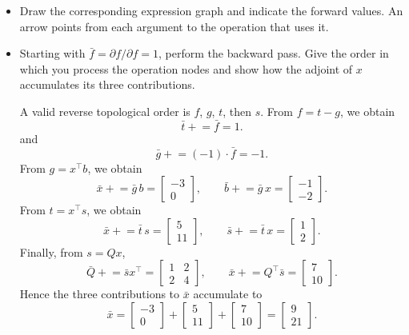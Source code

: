 \documentclass{article}
\theoremstyle{definition}
\theoremstyle{remark}
\begin{document}
\begin{itemize}
    \item Draw the corresponding expression graph and indicate the forward values. An arrow points from each argument to the operation that uses it.
    \item Starting with $\bar f=\partial f/\partial f=1$, perform the backward
    pass. Give the order in which you process the operation nodes and show how
    the adjoint of $x$ accumulates its three contributions.
    \begin{solution}
        A valid reverse topological order is $f$, $g$, $t$, then $s$. From
        $f=t-g$, we obtain
        \[
            \bar t \mathrel{+}=\bar f=1.
        \]
        and
        \[
            \bar g \mathrel{+}= (-1) \cdot \bar f=-1.
        \]
        From $g=x^\top b$, we obtain
        \[
            \bar x \mathrel{+}=\bar g\,b
                =\begin{bmatrix}-3\\0\end{bmatrix},
            \qquad
            \bar b \mathrel{+}=\bar g\,x
                =\begin{bmatrix}-1\\-2\end{bmatrix}.
        \]
        From $t=x^\top s$, we obtain
        \[
            \bar x \mathrel{+}=\bar t\,s
                =\begin{bmatrix}5\\11\end{bmatrix},
            \qquad
            \bar s \mathrel{+}=\bar t\,x
                =\begin{bmatrix}1\\2\end{bmatrix}.
        \]
        Finally, from $s=Qx$,
        \[
            \bar Q \mathrel{+}=\bar s x^\top
                =\begin{bmatrix}1&2\\2&4\end{bmatrix},
            \qquad
            \bar x \mathrel{+}=Q^\top\bar s
                =\begin{bmatrix}7\\10\end{bmatrix}.
        \]
        Hence the three contributions to $\bar x$ accumulate to
        \[
            \bar x=
            \begin{bmatrix}-3\\0\end{bmatrix}
            +\begin{bmatrix}5\\11\end{bmatrix}
            +\begin{bmatrix}7\\10\end{bmatrix}
            =\begin{bmatrix}9\\21\end{bmatrix}.
        \]
    \end{solution}
    

\end{itemize}
\end{document}
